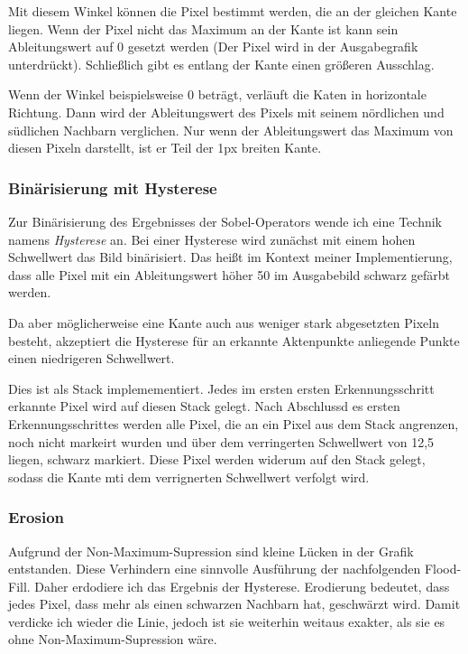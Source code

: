 Mit diesem Winkel können die Pixel bestimmt werden, die an der gleichen Kante liegen. Wenn der Pixel nicht das Maximum an der Kante ist kann sein Ableitungswert auf 0 gesetzt werden (Der Pixel wird in der Ausgabegrafik unterdrückt). Schließlich gibt es entlang der Kante einen größeren Ausschlag.  

Wenn der Winkel beispielsweise 0 beträgt, verläuft die Katen in horizontale Richtung. Dann wird der Ableitungswert des Pixels mit seinem nördlichen und südlichen Nachbarn verglichen. Nur wenn der Ableitungswert das Maximum von diesen Pixeln darstellt, ist er Teil der 1px breiten Kante.

\subsubsection{Binärisierung mit Hysterese}
Zur Binärisierung des Ergebnisses der Sobel-Operators wende ich eine Technik namens \textit{Hysterese} an. Bei einer Hysterese wird zunächst mit einem hohen Schwellwert das Bild binärisiert. Das heißt im Kontext  meiner Implementierung, dass alle Pixel mit ein Ableitungswert höher 50 im Ausgabebild schwarz gefärbt werden.

Da aber möglicherweise eine Kante auch aus weniger stark abgesetzten Pixeln besteht, akzeptiert die Hysterese für an erkannte Aktenpunkte anliegende Punkte einen niedrigeren Schwellwert.

Dies ist als Stack implemementiert. Jedes im ersten ersten Erkennungsschritt erkannte Pixel wird auf diesen Stack gelegt. Nach Abschlussd es ersten Erkennungsschrittes werden alle Pixel, die an ein Pixel aus dem Stack angrenzen, noch nicht markeirt wurden und über dem verringerten Schwellwert von 12,5 liegen, schwarz markiert. Diese Pixel werden widerum auf den Stack gelegt, sodass die Kante mti dem verrignerten Schwellwert verfolgt wird. 

\subsubsection{Erosion}
Aufgrund der Non-Maximum-Supression sind kleine Lücken in der Grafik entstanden. Diese Verhindern eine sinnvolle Ausführung der nachfolgenden Flood-Fill. Daher erdodiere ich das Ergebnis der Hysterese. Erodierung bedeutet, dass jedes Pixel, dass mehr als einen schwarzen Nachbarn hat, geschwärzt wird.
Damit verdicke ich wieder die Linie, jedoch ist sie weiterhin weitaus exakter, als sie es ohne Non-Maximum-Supression wäre. 

